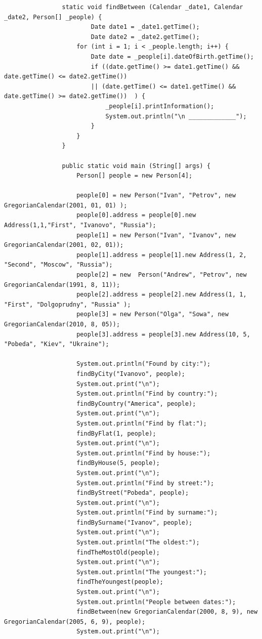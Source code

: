 \documentclass[a4paper]{article}
\begin{document}
\begin{enumerate}
\begin{lstlisting}
                static void findBetween (Calendar _date1, Calendar _date2, Person[] _people) {
                        Date date1 = _date1.getTime();
                        Date date2 = _date2.getTime();
                    for (int i = 1; i < _people.length; i++) {
                        Date date = _people[i].dateOfBirth.getTime();
                        if ((date.getTime() >= date1.getTime() && date.getTime() <= date2.getTime()) 
                        || (date.getTime() <= date1.getTime() && date.getTime() >= date2.getTime())  ) {
                            _people[i].printInformation();
                            System.out.println("\n _____________");
                        }
                    }
                }
            
                public static void main (String[] args) {
                    Person[] people = new Person[4];
                    
                    people[0] = new Person("Ivan", "Petrov", new GregorianCalendar(2001, 01, 01) );
                    people[0].address = people[0].new Address(1,1,"First", "Ivanovo", "Russia");
                    people[1] = new Person("Ivan", "Ivanov", new GregorianCalendar(2001, 02, 01));
                    people[1].address = people[1].new Address(1, 2, "Second", "Moscow", "Russia");
                    people[2] = new  Person("Andrew", "Petrov", new GregorianCalendar(1991, 8, 11));
                    people[2].address = people[2].new Address(1, 1, "First", "Dolgoprudny", "Russia" );
                    people[3] = new Person("Olga", "Sowa", new GregorianCalendar(2010, 8, 05));
                    people[3].address = people[3].new Address(10, 5, "Pobeda", "Kiev", "Ukraine");
            
                    System.out.println("Found by city:");
                    findByCity("Ivanovo", people);
                    System.out.print("\n");
                    System.out.println("Find by country:");
                    findByCountry("America", people);
                    System.out.print("\n");
                    System.out.println("Find by flat:");
                    findByFlat(1, people);
                    System.out.print("\n");
                    System.out.println("Find by house:");
                    findByHouse(5, people);
                    System.out.print("\n");
                    System.out.println("Find by street:");
                    findByStreet("Pobeda", people);
                    System.out.print("\n");
                    System.out.println("Find by surname:");
                    findBySurname("Ivanov", people);
                    System.out.print("\n");
                    System.out.println("The oldest:");
                    findTheMostOld(people);
                    System.out.print("\n");
                    System.out.println("The youngest:");
                    findTheYoungest(people);
                    System.out.print("\n");
                    System.out.println("People between dates:");
                    findBetween(new GregorianCalendar(2000, 8, 9), new GregorianCalendar(2005, 6, 9), people);
                    System.out.print("\n");
            

\end{lstlisting}
\end{enumerate}
\end{document}
